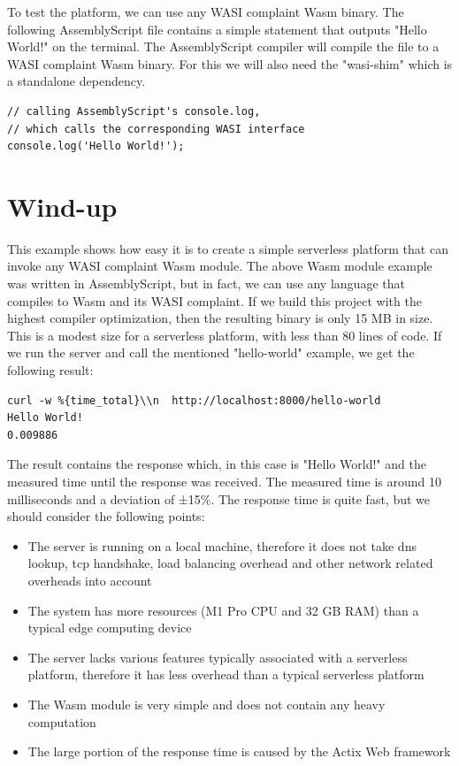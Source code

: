 %
To test the platform, we can use any WASI complaint Wasm binary. The following AssemblyScript file contains a simple statement that outputs "Hello World!" on the terminal. The AssemblyScript compiler will compile the file to a WASI complaint Wasm binary. For this we will also need the "wasi-shim" which is a standalone dependency.
%
\begin{lstlisting}[frame=lines, style=JavaScript, caption={AssemblyScript file with a simple console output}, showstringspaces=false, label={lst:as-hello-world}, captionpos=b]
// calling AssemblyScript's console.log, 
// which calls the corresponding WASI interface
console.log('Hello World!');
\end{lstlisting}

\section{Wind-up}

This example shows how easy it is to create a simple \gls{serverless} platform that can invoke any WASI complaint Wasm module. The above Wasm module example was written in AssemblyScript, but in fact, we can use any language that compiles to Wasm and its WASI complaint. If we build this project with the highest compiler optimization, then the resulting binary is only 15 MB in size. This is a modest size for a serverless platform, with less than 80 lines of code. If we run the server and call the mentioned "hello-world" example, we get the following result:
\begin{lstlisting}[frame=lines]
curl -w %{time_total}\\n  http://localhost:8000/hello-world
Hello World!
0.009886
\end{lstlisting}

The result contains the response which, in this case is "Hello World!" and the measured time until the response was received. The measured time is around 10 milliseconds and a deviation of ±15\%. The response time is quite fast, but we should consider the following points:
\begin{itemize}
    \item The server is running on a local machine, therefore it does not take dns lookup, tcp handshake, load balancing overhead and other network related overheads into account
    \item The system has more resources (M1 Pro CPU and 32 GB RAM) than a typical \gls{edge computing} device
    \item The server lacks various features typically associated with a \gls{serverless} platform, therefore it has less overhead than a typical serverless platform
    \item The Wasm module is very simple and does not contain any heavy computation
    \item The large portion of the response time is caused by the Actix Web framework
\end{itemize}

